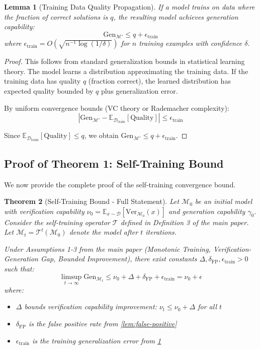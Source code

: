 \documentclass{article}
\newtheorem{theorem}{Theorem}
\newtheorem{lemma}[theorem]{Lemma}
\theoremstyle{definition}
\theoremstyle{remark}
\newcommand{\M}{\mathcal{M}}
\newcommand{\D}{\mathcal{D}}
\newcommand{\T}{\mathcal{T}}
\newcommand{\Gen}{\text{Gen}}
\newcommand{\Ver}{\text{Ver}}
\newcommand{\E}{\mathbb{E}}
\begin{document}
\begin{lemma}[Training Data Quality Propagation]
\label{lem:quality-propagation}
If a model trains on data where the fraction of correct solutions is \(q\), the resulting model achieves generation capability:
\[
\Gen_{\M'} \leq q + \epsilon_{\text{train}}
\]
where \(\epsilon_{\text{train}} = O(\sqrt{n^{-1} \log(1/\delta)})\) for \(n\) training examples with confidence \(\delta\).
\end{lemma}

\begin{proof}
This follows from standard generalization bounds in statistical learning theory. The model learns a distribution approximating the training data. If the training data has quality \(q\) (fraction correct), the learned distribution has expected quality bounded by \(q\) plus generalization error.

By uniform convergence bounds (VC theory or Rademacher complexity):
\[
\left| \Gen_{\M'} - \E_{\D_{\text{train}}}[\text{Quality}] \right| \leq \epsilon_{\text{train}}
\]

Since \(\E_{\D_{\text{train}}}[\text{Quality}] \leq q\), we obtain \(\Gen_{\M'} \leq q + \epsilon_{\text{train}}\).
\end{proof}

\subsection{Proof of Theorem 1: Self-Training Bound}

We now provide the complete proof of the self-training convergence bound.

\begin{theorem}[Self-Training Bound - Full Statement]
\label{thm:self-training-bound-full}
Let \(\M_0\) be an initial model with verification capability \(\nu_0 = \E_{x \sim \D}[\Ver_{\M_0}(x)]\) and generation capability \(\gamma_0\). Consider the self-training operator \(\T\) defined in Definition 3 of the main paper. Let \(\M_t = \T^t(\M_0)\) denote the model after \(t\) iterations.

Under Assumptions 1-3 from the main paper (Monotonic Training, Verification-Generation Gap, Bounded Improvement), there exist constants \(\Delta, \delta_{\text{FP}}, \epsilon_{\text{train}} > 0\) such that:
\[
\limsup_{t \to \infty} \Gen_{\M_t} \leq \nu_0 + \Delta + \delta_{\text{FP}} + \epsilon_{\text{train}} = \nu_0 + \epsilon
\]
where:
\begin{itemize}
\item \(\Delta\) bounds verification capability improvement: \(\nu_t \leq \nu_0 + \Delta\) for all \(t\)
\item \(\delta_{\text{FP}}\) is the false positive rate from \cref{lem:false-positive}
\item \(\epsilon_{\text{train}}\) is the training generalization error from \cref{lem:quality-propagation}
\end{itemize}
\end{theorem}
\end{document}
